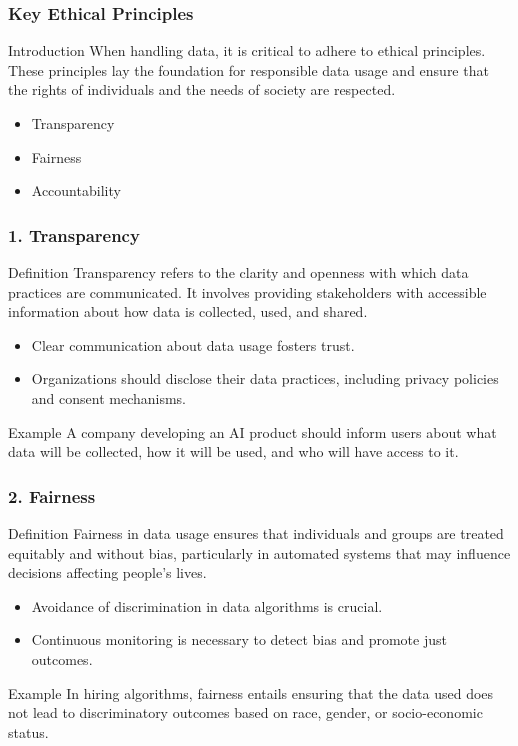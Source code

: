 \documentclass[aspectratio=169]{beamer}
\begin{document}
\begin{frame}[fragile]
    \frametitle{Key Ethical Principles}
    \begin{block}{Introduction}
        When handling data, it is critical to adhere to ethical principles. These principles lay the foundation for responsible data usage and ensure that the rights of individuals and the needs of society are respected.
    \end{block}
    \begin{itemize}
        \item Transparency
        \item Fairness
        \item Accountability
    \end{itemize}
\end{frame}

\begin{frame}[fragile]
    \frametitle{1. Transparency}
    \begin{block}{Definition}
        Transparency refers to the clarity and openness with which data practices are communicated. It involves providing stakeholders with accessible information about how data is collected, used, and shared.
    \end{block}
    \begin{itemize}
        \item Clear communication about data usage fosters trust.
        \item Organizations should disclose their data practices, including privacy policies and consent mechanisms.
    \end{itemize}
    \begin{block}{Example}
        A company developing an AI product should inform users about what data will be collected, how it will be used, and who will have access to it.
    \end{block}
\end{frame}

\begin{frame}[fragile]
    \frametitle{2. Fairness}
    \begin{block}{Definition}
        Fairness in data usage ensures that individuals and groups are treated equitably and without bias, particularly in automated systems that may influence decisions affecting people's lives.
    \end{block}
    \begin{itemize}
        \item Avoidance of discrimination in data algorithms is crucial.
        \item Continuous monitoring is necessary to detect bias and promote just outcomes.
    \end{itemize}
    \begin{block}{Example}
        In hiring algorithms, fairness entails ensuring that the data used does not lead to discriminatory outcomes based on race, gender, or socio-economic status.
    \end{block}
\end{frame}
\end{document}
